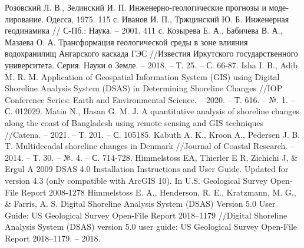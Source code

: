 \documentclass[732,14pt,final]{studrep}
\begin{document}
\begin{thebibliography}{99}
Розовский Л. В., Зелинский И. П. Инженерно-геологические прогнозы и моде­лирование. Одесса, 1975. 115 с.
Иванов И. П., Тржцинский Ю. Б. Инженерная геодинамика // С-Пб.: Наука. – 2001. 411 с.
Козырева Е. А., Бабичева В. А., Мазаева О. А. Трансформация геологической среды в зоне влияния водохранилищ Ангарского каскада ГЭС //Известия Иркутского государственного университета. Серия: Науки о Земле. – 2018. – Т. 25. – С. 66-87.
Isha I. B., Adib M. R. M. Application of Geospatial Information System (GIS) using Digital Shoreline Analysis System (DSAS) in Determining Shoreline Changes //IOP Conference Series: Earth and Environmental Science. – 2020. – Т. 616. – №. 1. – С. 012029.
Matin N., Hasan G. M. J. A quantitative analysis of shoreline changes along the coast of Bangladesh using remote sensing and GIS techniques //Catena. – 2021. – Т. 201. – С. 105185.
Kabuth A. K., Kroon A., Pedersen J. B. T. Multidecadal shoreline changes in Denmark //Journal of Coastal Research. – 2014. – Т. 30. – №. 4. – С. 714-728.
Himmelstoss EA, Thierler E R, Zichichi J, \& Ergul A 2009 DSAS 4.0 Installation Instructions and User Guide. Updated for version 4.3 (only compatible with ArcGIS 10). In U.S. Geological Survey Open-File Report 2008-1278
Himmelstoss E. A., Henderson, R. E., Kratzmann, M. G., \& Farris, A. S. Digital Shoreline Analysis System (DSAS) Version 5.0 User Guide: US Geological Survey Open-File Report 2018–1179 //Digital Shoreline Analysis System (DSAS) version 5.0 user guide: US Geological Survey Open-File Report 2018–1179. – 2018.

\end{thebibliography}
\end{document}

